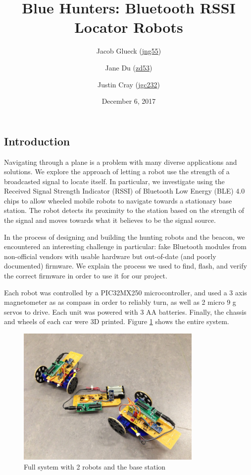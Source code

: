 \documentclass[]{article}
\title{Blue Hunters: Bluetooth RSSI Locator Robots}
\author{Jacob Glueck (\href{mailto:jng55@cornell.edu}{jng55}) \and Jane Du (\href{mailto:zd53@cornell.edu}{zd53}) \and Justin Cray (\href{mailto:jgc232@cornell.edu}{jgc232})}
\date{December 6, 2017}
\begin{document}
\maketitle

\hypertarget{introduction}{%
\subsection{Introduction}\label{introduction}}

Navigating through a plane is a problem with many diverse applications and solutions. We explore the approach of letting a robot use the strength of a broadcasted signal to locate itself. In particular, we investigate using the Received Signal Strength Indicator (RSSI) of Bluetooth Low Energy (BLE) 4.0 chips to allow wheeled mobile robots to navigate towards a stationary base station. The robot detects its proximity to the station based on the strength of the signal and moves towards what it believes to be the signal source. 

In the process of designing and building the hunting robots and the beacon, we encountered an interesting challenge in particular: fake Bluetooth modules from non-official vendors with usable hardware but out-of-date (and poorly documented) firmware. We explain the process we used to find, flash, and verify the correct firmware in order to use it for our project.

Each robot was controlled by a PIC32MX250 microcontroller, and used a 3 axis magnetometer as as compass in order to reliably turn, as well as 2 micro 9 g servos to drive.
Each unit was powered with 3 AA batteries.
Finally, the chassis and wheels of each car were 3D printed.
Figure \ref{fig:robotsystem} shows the entire system.

\begin{figure}
  \centering
  \includegraphics[width=0.8\textwidth]{full_system.jpg}
  \caption{Full system with 2 robots and the base station}
  \label{fig:robotsystem}
\end{figure}
\end{document}
